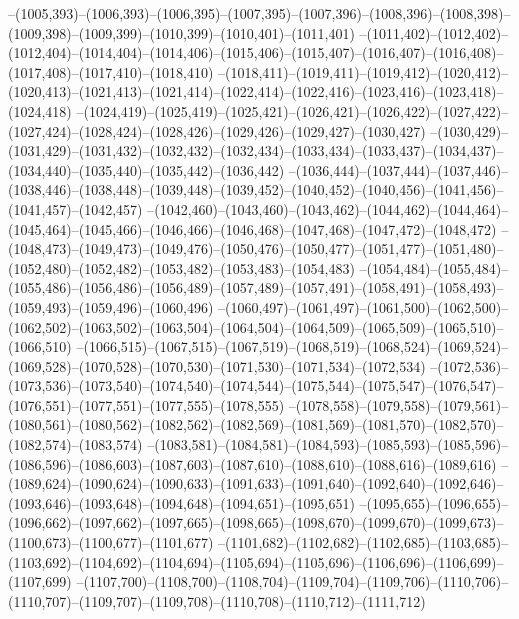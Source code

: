 --(1005,393)--(1006,393)--(1006,395)--(1007,395)--(1007,396)--(1008,396)--(1008,398)--(1009,398)--(1009,399)--(1010,399)--(1010,401)--(1011,401)
--(1011,402)--(1012,402)--(1012,404)--(1014,404)--(1014,406)--(1015,406)--(1015,407)--(1016,407)--(1016,408)--(1017,408)--(1017,410)--(1018,410)
--(1018,411)--(1019,411)--(1019,412)--(1020,412)--(1020,413)--(1021,413)--(1021,414)--(1022,414)--(1022,416)--(1023,416)--(1023,418)--(1024,418)
--(1024,419)--(1025,419)--(1025,421)--(1026,421)--(1026,422)--(1027,422)--(1027,424)--(1028,424)--(1028,426)--(1029,426)--(1029,427)--(1030,427)
--(1030,429)--(1031,429)--(1031,432)--(1032,432)--(1032,434)--(1033,434)--(1033,437)--(1034,437)--(1034,440)--(1035,440)--(1035,442)--(1036,442)
--(1036,444)--(1037,444)--(1037,446)--(1038,446)--(1038,448)--(1039,448)--(1039,452)--(1040,452)--(1040,456)--(1041,456)--(1041,457)--(1042,457)
--(1042,460)--(1043,460)--(1043,462)--(1044,462)--(1044,464)--(1045,464)--(1045,466)--(1046,466)--(1046,468)--(1047,468)--(1047,472)--(1048,472)
--(1048,473)--(1049,473)--(1049,476)--(1050,476)--(1050,477)--(1051,477)--(1051,480)--(1052,480)--(1052,482)--(1053,482)--(1053,483)--(1054,483)
--(1054,484)--(1055,484)--(1055,486)--(1056,486)--(1056,489)--(1057,489)--(1057,491)--(1058,491)--(1058,493)--(1059,493)--(1059,496)--(1060,496)
--(1060,497)--(1061,497)--(1061,500)--(1062,500)--(1062,502)--(1063,502)--(1063,504)--(1064,504)--(1064,509)--(1065,509)--(1065,510)--(1066,510)
--(1066,515)--(1067,515)--(1067,519)--(1068,519)--(1068,524)--(1069,524)--(1069,528)--(1070,528)--(1070,530)--(1071,530)--(1071,534)--(1072,534)
--(1072,536)--(1073,536)--(1073,540)--(1074,540)--(1074,544)--(1075,544)--(1075,547)--(1076,547)--(1076,551)--(1077,551)--(1077,555)--(1078,555)
--(1078,558)--(1079,558)--(1079,561)--(1080,561)--(1080,562)--(1082,562)--(1082,569)--(1081,569)--(1081,570)--(1082,570)--(1082,574)--(1083,574)
--(1083,581)--(1084,581)--(1084,593)--(1085,593)--(1085,596)--(1086,596)--(1086,603)--(1087,603)--(1087,610)--(1088,610)--(1088,616)--(1089,616)
--(1089,624)--(1090,624)--(1090,633)--(1091,633)--(1091,640)--(1092,640)--(1092,646)--(1093,646)--(1093,648)--(1094,648)--(1094,651)--(1095,651)
--(1095,655)--(1096,655)--(1096,662)--(1097,662)--(1097,665)--(1098,665)--(1098,670)--(1099,670)--(1099,673)--(1100,673)--(1100,677)--(1101,677)
--(1101,682)--(1102,682)--(1102,685)--(1103,685)--(1103,692)--(1104,692)--(1104,694)--(1105,694)--(1105,696)--(1106,696)--(1106,699)--(1107,699)
--(1107,700)--(1108,700)--(1108,704)--(1109,704)--(1109,706)--(1110,706)--(1110,707)--(1109,707)--(1109,708)--(1110,708)--(1110,712)--(1111,712)
